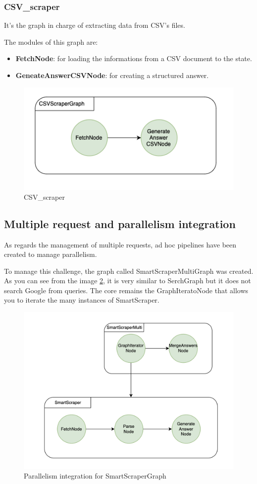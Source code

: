 \subsubsection{CSV\_scraper}
It's the graph in charge of extracting data from CSV's files.

The modules of this graph are: 
\begin{itemize}
    \item \textbf{FetchNode}: for loading the informations from a CSV document to the state.
    \item \textbf{GeneateAnswerCSVNode}: for creating a structured answer.
\end{itemize}

\begin{figure}[H]
    \centering
    \includegraphics[width=0.75\linewidth]{Assets/csv_scraper.png}
    \caption{CSV\_scraper}
    \label{fig:csv-scraper}
\end{figure}
\subsection{Multiple request and parallelism integration}
As regards the management of multiple requests, ad hoc pipelines have been created to manage parallelism.

To manage this challenge, the graph called SmartScraperMultiGraph was created.
As you can see from the image \ref{fig:multi}, it is very similar to SerchGraph but it does not search Google from queries.
The core remains the GraphIteratoNode that allows you to iterate the many instances of SmartScraper.
\begin{figure}[H]
    \centering
    \includegraphics[width=0.75\linewidth]{Assets/multi_graph.png}
    \caption{Parallelism integration for SmartScraperGraph}
    \label{fig:multi}
\end{figure}


